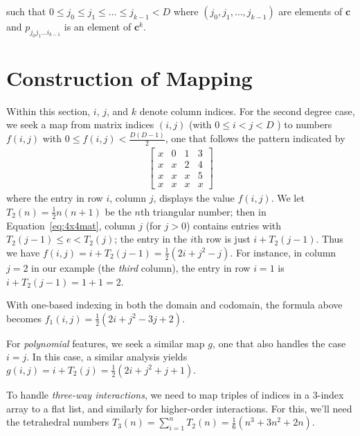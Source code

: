 \documentclass{article}
\begin{document}
such that $ 0 \le j_0 \le j_1 \le \dots \le j_{k-1} < D$
where $(j_0, j_1, \dots, j_{k-1})$ are elements of $\bm{c}$ and $p_{j_0j_1 \dots i_{k-1}}$ is an element of $\bm{c}^k$. %

\section{Construction of Mapping}
Within this section, $i$, $j$, and $k$ denote column indices.
For the second degree case, we seek a map from matrix indices $(i, j)$ (with $0 \le i < j < D$ ) to numbers $f(i, j)$ with $0 \le f(i, j) < \frac{D(D-1)}{2}$, one that follows the pattern indicated by 
\begin{align}
\begin{bmatrix}
x & 0 & 1 & 3 \\
x & x & 2 & 4 \\
x & x & x & 5 \\
x & x & x & x
\end{bmatrix}
\label{eq:4x4mat}
\end{align}
where the entry in row $i$, column $j$, displays the value $f(i, j)$. We let $T_2(n) = \frac{1}{2} n(n+1)$ 
be the $n$th triangular number; then in Equation~\ref{eq:4x4mat}, column $j$ (for $j > 0$) contains entries with  
$T_2(j-1) \le e < T_2(j)$; the entry in the $i$th row is just $i + T_2(j-1)$. Thus we have
$
f(i, j) 
= i + T_2(j-1) =  \frac{1}{2}(2i + j^2-j).$
For instance, in column $j = 2$ in our example (the \emph{third} column), the entry in row $i = 1$ is 
$i + T_2(j-1) = 1 + 1 = 2$. 

With one-based indexing in both the domain and codomain, the formula above becomes
$f_1(i, j)  = \frac{1}{2}(2i + j^2 - 3j + 2).$

For \emph{polynomial} features, we seek a similar map $g$, one that also handles the case $i = j$. In this case, a similar analysis yields
$ g(i, j) = i + T_2(j) = \frac{1}{2} (2i + j^2 + j + 1).$


To handle \emph{three-way interactions}, we need to map triples of indices in a 3-index array to a flat list, and similarly for higher-order interactions. For this, we'll need the tetrahedral numbers $T_3(n) = \sum_{i=1}^n T_{2}(n) = 
\frac{1}{6}(n^3 + 3n^2 + 2n)$.
\end{document}
